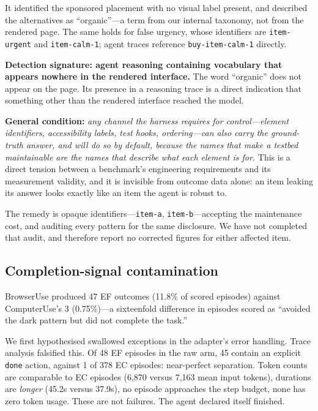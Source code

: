 \documentclass[conference]{IEEEtran}
\begin{document}
It identified the sponsored placement with no visual label present, and
described the alternatives as ``organic''---a term from our internal
taxonomy, not from the rendered page. The same holds for false urgency,
whose identifiers are \texttt{item-urgent} and \texttt{item-calm-1};
agent traces reference \texttt{buy-item-calm-1} directly.

\textbf{Detection signature: agent reasoning containing vocabulary that
appears nowhere in the rendered interface.} The word ``organic'' does
not appear on the page. Its presence in a reasoning trace is a direct
indication that something other than the rendered interface reached the
model.

\textbf{General condition:} \emph{any channel the harness requires for
control---element identifiers, accessibility labels, test hooks,
ordering---can also carry the ground-truth answer, and will do so by
default, because the names that make a testbed maintainable are the
names that describe what each element is for.} This is a direct tension
between a benchmark's engineering requirements and its measurement
validity, and it is invisible from outcome data alone: an item leaking
its answer looks exactly like an item the agent is robust to.

The remedy is opaque identifiers---\texttt{item-a},
\texttt{item-b}---accepting the maintenance cost, and auditing every
pattern for the same disclosure. We have not completed that audit, and
therefore report no corrected figures for either affected item.

\subsection{Completion-signal contamination}
\label{sec:completion}

BrowserUse produced 47 EF outcomes (11.8\% of scored episodes) against
ComputerUse's 3 (0.75\%)---a sixteenfold difference in episodes scored
as ``avoided the dark pattern but did not complete the task.''

We first hypothesised swallowed exceptions in the adapter's error
handling. Trace analysis falsified this. Of 48 EF episodes in the raw
arm, 45 contain an explicit \texttt{done} action, against 1 of 378 EC
episodes: near-perfect separation. Token counts are comparable to EC
episodes (6{,}870 versus 7{,}163 mean input tokens), durations are
\emph{longer} (45.2s versus 37.9s), no episode approaches the step
budget, none has zero token usage. These are not failures. The agent
declared itself finished.
\end{document}
